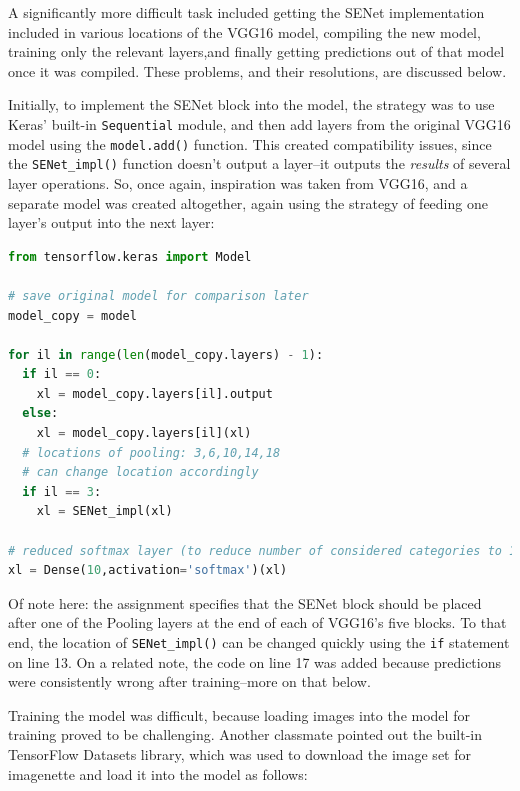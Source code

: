 \documentclass{article}
\begin{document}
\par A significantly more difficult task included getting the SENet implementation included in various locations of the VGG16 model, compiling the new model, training only the relevant layers,and finally getting predictions out of that model once it was compiled. These problems, and their resolutions, are discussed below.

\par Initially, to implement the SENet block into the model, the strategy was to use Keras' built-in \lstinline{Sequential} module, and then add layers from the original VGG16 model using the \lstinline{model.add()} function.
This created compatibility issues, since the \lstinline{SENet_impl()} function doesn't output a layer--it outputs the \textit{results} of several layer operations.
So, once again, inspiration was taken from VGG16, and a separate model was created altogether, again using the strategy of feeding one layer's output into the next layer:

\begin{lstlisting}[language=Python]
from tensorflow.keras import Model

# save original model for comparison later
model_copy = model

for il in range(len(model_copy.layers) - 1):
  if il == 0:
    xl = model_copy.layers[il].output
  else:
    xl = model_copy.layers[il](xl)
  # locations of pooling: 3,6,10,14,18
  # can change location accordingly
  if il == 3:
    xl = SENet_impl(xl)

# reduced softmax layer (to reduce number of considered categories to 10)
xl = Dense(10,activation='softmax')(xl)
\end{lstlisting}

\par Of note here: the assignment specifies that the SENet block should be placed after one of the Pooling layers at the end of each of VGG16's five blocks. 
To that end, the location of \lstinline{SENet_impl()} can be changed quickly using the \lstinline{if} statement on line 13. 
On a related note, the code on line 17 was added because predictions were consistently wrong after training--more on that below.

\par Training the model was difficult, because loading images into the model for training proved to be challenging.
Another classmate pointed out the built-in TensorFlow Datasets library, which was used to download the image set for imagenette and load it into the model as follows:
\end{document}
